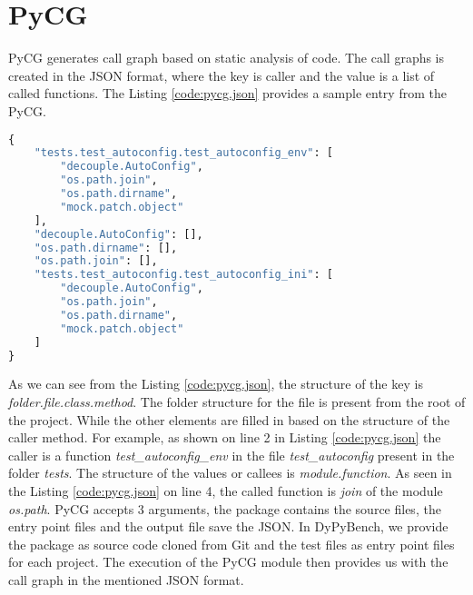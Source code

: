 \section{PyCG}
PyCG generates call graph based on static analysis of code.
The call graphs is created in the JSON format, where the key is caller and the value is a list of called functions.
The Listing \ref{code:pycg.json} provides a sample entry from the PyCG.
\begin{lstlisting}[caption=Key-Value Pair in PyCG,label=code:pycg.json,language=python]
{
    "tests.test_autoconfig.test_autoconfig_env": [
        "decouple.AutoConfig",
        "os.path.join",
        "os.path.dirname",
        "mock.patch.object"
    ],
    "decouple.AutoConfig": [],
    "os.path.dirname": [],
    "os.path.join": [],
    "tests.test_autoconfig.test_autoconfig_ini": [
        "decouple.AutoConfig",
        "os.path.join",
        "os.path.dirname",
        "mock.patch.object"
    ]
}
\end{lstlisting}

As we can see from the Listing \ref{code:pycg.json}, the structure of the key is \textit{folder.file.class.method}.
The folder structure for the file is present from the root of the project.
While the other elements are filled in based on the structure of the caller method.
For example, as shown on line 2 in Listing \ref{code:pycg.json} the caller is a function \textit{test\_autoconfig\_env} in the file \textit{test\_autoconfig} present in the folder \textit{tests}.
The structure of the values or callees is \textit{module.function}.
As seen in the Listing \ref{code:pycg.json} on line 4, the called function is \textit{join} of the module \textit{os.path}.
PyCG accepts 3 arguments, the package contains the source files, the entry point files and the output file save the JSON.
In DyPyBench, we provide the package as source code cloned from Git and the test files as entry point files for each project.
The execution of the PyCG module then provides us with the call graph in the mentioned JSON format.

